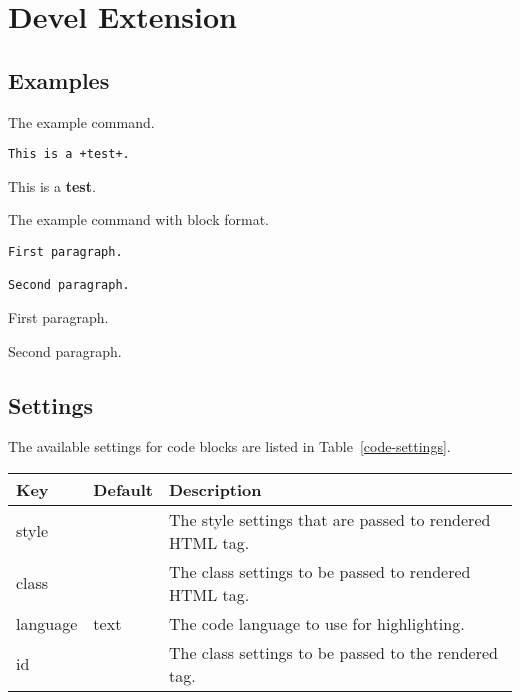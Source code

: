 
\chapter{\label{devel-extension}Devel Extension}
\section{\label{examples}Examples}
\begin{example}[label=markdown-example]{The example command.}

\begin{verbatim}
This is a +test+.
\end{verbatim}

\tcblower
\par This is a \textbf{test}.
\end{example}

\begin{example}[label=markdown-example2]{The example command with block format.}

\begin{verbatim}
First paragraph.

Second paragraph.
\end{verbatim}

\tcblower
\par First paragraph.
\par Second paragraph. 
\end{example}

\section{\label{settings}Settings}
\par The available settings for code blocks are listed in Table~\ref{code-settings}.\par\begin{tabulary}{\textwidth}{LLL}
\toprule
Key &Default &Description \\
\midrule
style & &The style settings that are passed to rendered HTML tag. \\
class & &The class settings to be passed to rendered HTML tag. \\
language &text &The code language to use for highlighting. \\
id & &The class settings to be passed to the rendered tag. \\
\bottomrule
\end{tabulary}


